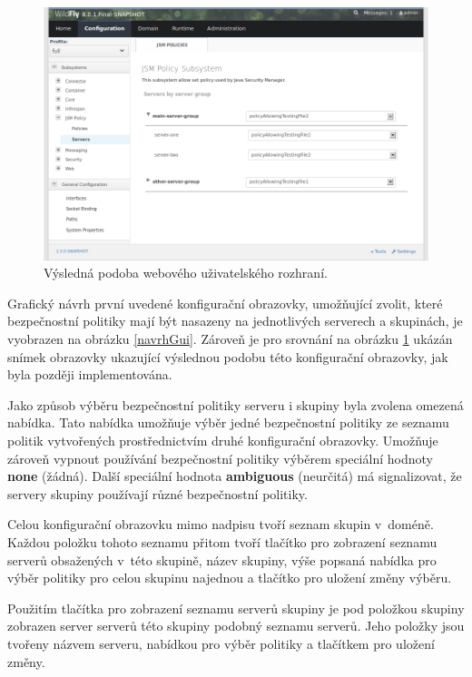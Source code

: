 \begin{figure}[ht]
  \centering
  \includegraphics[width=14cm]{fig/jsmpolicy-servers}
  \caption{Výsledná podoba webového uživatelského rozhraní.}
  \label{vysledneGui}
\end{figure}

Grafický návrh první uvedené konfigurační obrazovky, umožňující zvolit, které bezpečnostní politiky mají být nasazeny na jednotlivých serverech a skupinách, je vyobrazen na obrázku \ref{navrhGui}. Zároveň je pro srovnání na obrázku \ref{vysledneGui} ukázán snímek obrazovky ukazující výslednou podobu této konfigurační obrazovky, jak byla později implementována.

Jako způsob výběru bezpečnostní politiky serveru i skupiny byla zvolena omezená nabídka. Tato nabídka umožňuje výběr jedné bezpečnostní politiky ze seznamu politik vytvořených prostřednictvím druhé konfigurační obrazovky. Umožňuje zároveň vypnout používání bezpečnostní politiky výběrem speciální hodnoty {\bf none} (žádná). Další speciální hodnota {\bf ambiguous} (neurčitá) má signalizovat, že servery skupiny používají různé bezpečnostní politiky.

Celou konfigurační obrazovku mimo nadpisu tvoří seznam skupin v~doméně. Každou položku tohoto seznamu přitom tvoří tlačítko pro zobrazení seznamu serverů obsažených v~této skupině, název skupiny, výše popsaná nabídka pro výběr politiky pro celou skupinu najednou a tlačítko pro uložení změny výběru.

Použitím tlačítka pro zobrazení seznamu serverů skupiny je pod položkou skupiny zobrazen server serverů této skupiny podobný seznamu serverů. Jeho položky jsou tvořeny názvem serveru, nabídkou pro výběr politiky a tlačítkem pro uložení změny.

